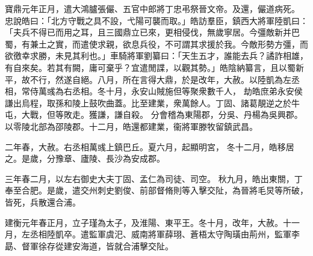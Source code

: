 \begin{pinyinscope}
寶鼎元年正月，遣大鴻臚張儼、五官中郎將丁忠弔祭晉文帝。及還，儼道病死。
忠說皓曰：「北方守戰之具不設，弋陽可襲而取。」皓訪羣臣，鎮西大將軍陸凱曰：「夫兵不得已而用之耳，且三國鼎立已來，更相侵伐，無歲寧居。今彊敵新并巴蜀，有兼土之實，而遣使求親，欲息兵役，不可謂其求援於我。今敵形勢方彊，而欲徼幸求勝，未見其利也。」車騎將軍劉纂曰：「天生五才，誰能去兵？譎詐相雄，有自來矣。若其有闕，庸可棄乎？宜遣閒諜，以觀其勢。」皓陰納纂言，且以蜀新平，故不行，然遂自絕。八月，所在言得大鼎，於是改年，大赦。以陸凱為左丞相，常侍萬彧為右丞相。冬十月，永安山賊施但等聚衆數千人，
劫皓庶弟永安侯謙出烏程，取孫和陵上鼓吹曲蓋。比至建業，衆萬餘人。丁固、諸葛靚逆之於牛屯，大戰，但等敗走。獲謙，謙自殺。
分會稽為東陽郡，分吳、丹楊為吳興郡。
以零陵北部為邵陵郡。十二月，皓還都建業，衞將軍滕牧留鎮武昌。


二年春，大赦。右丞相萬彧上鎮巴丘。夏六月，起顯明宮，
冬十二月，皓移居之。是歲，分豫章、廬陵、長沙為安成郡。


三年春二月，以左右御史大夫丁固、孟仁為司徒、司空。
秋九月，皓出東關，丁奉至合肥。是歲，遣交州刺史劉俊、前部督脩則等入擊交阯，為晉將毛炅等所破，皆死，兵散還合浦。


建衡元年春正月，立子瑾為太子，及淮陽、東平王。冬十月，改年，大赦。十一月，左丞相陸凱卒。遣監軍虞汜、威南將軍薛珝、蒼梧太守陶璜由荊州，監軍李勗、督軍徐存從建安海道，皆就合浦擊交阯。



\end{pinyinscope}
